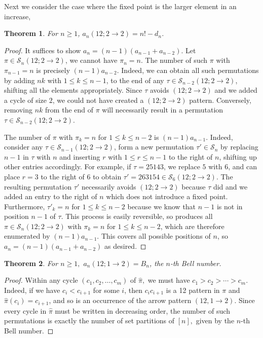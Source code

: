 \documentclass[11pt]{article}
\renewcommand\S{\mathcal S}
\newtheorem{theorem}{Theorem}[section]
\theoremstyle{definition}
\begin{document}
Next we consider the case where the fixed point is the larger element in an increase,

\begin{theorem} \label{thm:12t22}
    For $n \geq 1$, $a_n(12; 2 \to 2) = n! - d_n$.
\end{theorem}


\begin{proof}
    It suffices to show $a_n = (n-1)(a_{n-1} + a_{n-2})$. Let $\pi \in \S_n(12;2 \to 2)$, we cannot have $\pi_n = n$. The number of such $\pi$ with $\pi_{n-1} = n$ is precisely $(n-1) a_{n-2}$. Indeed, we can obtain all such permutations by adding $nk$ with $1 \leq k \leq n-1$, to the end of any $\tau \in \S_{n-2}(12;2\to2)$, shifting all the elements appropriately. Since $\tau$ avoids $(12; 2 \to 2)$ and we added a cycle of size $2$, we could not have created a $(12; 2 \to 2)$ pattern. Conversely, removing $nk$ from the end of $\pi$ will necessarily result in a permutation $\tau \in \S_{n-2}(12 ; 2 \to 2)$.

    The number of $\pi$ with $\pi_k = n$ for $1 \leq k \leq n-2$ is $(n-1)a_{n-1}$. Indeed, consider any $\tau \in \S_{n-1}(12;2\to2)$, form a new permutation $\tau' \in \S_n$ by replacing $n-1$ in $\tau$ with $n$ and inserting $r$ with $1 \leq r \leq n-1$ to the right of $n$, shifting up other entries accordingly. For example, if $\tau = 25143$, we replace $5$ with $6$, and can place $r = 3$ to the right of $6$ to obtain $\tau' = 263154 \in \S_6(12; 2\to2)$. The resulting permutation $\tau'$ necessarily avoids $(12; 2 \to2)$ because $\tau$ did and we added an entry to the right of $n$ which does not introduce a fixed point. Furthermore, $\tau'_k = n$ for $1 \leq k \leq n-2$ because we know that $n-1$ is not in position $n-1$ of $\tau$. This process is easily reversible, so produces all $\pi \in \S_n(12; 2\to2)$ with $\pi_k = n$ for $1 \leq k \leq n-2$, which are therefore enumerated by $(n-1)a_{n-1}$. This covers all possible positions of $n$, so $a_n = (n-1)(a_{n-1} + a_{n-2})$ as desired.
\end{proof}



\begin{theorem} \label{thm:12t12} For $n\geq 1,$
    $a_n(12;1\to2) = B_n$, the $n$-th Bell number. %
\end{theorem}

\begin{proof}
    Within any cycle $(c_1,c_2,\dots,c_m)$ of $\hat\pi,$ we must have $c_1>c_2>\cdots>c_m$. Indeed, if we have $c_i<c_{i+1}$ for some $i$, then $c_ic_{i+1}$ is a 12 pattern in $\pi$ and $\hat\pi(c_i)=c_{i+1}$, and so is an occurrence of the arrow pattern $(12, 1\to 2).$ Since every cycle in $\hat\pi$ must be written in decreasing order, the number of such permutations is exactly the number of set partitions of $[n],$ given by the $n$-th Bell number. 
\end{proof}
\end{document}
